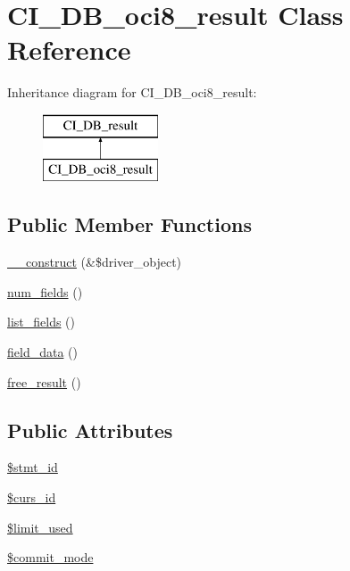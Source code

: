 \hypertarget{class_c_i___d_b__oci8__result}{}\section{C\+I\+\_\+\+D\+B\+\_\+oci8\+\_\+result Class Reference}
\label{class_c_i___d_b__oci8__result}
Inheritance diagram for C\+I\+\_\+\+D\+B\+\_\+oci8\+\_\+result\+:\begin{figure}[H]
\begin{center}
\leavevmode
\includegraphics[height=2.000000cm]{class_c_i___d_b__oci8__result}
\end{center}
\end{figure}
\subsection*{Public Member Functions}
\begin{DoxyCompactItemize}
\item 
\mbox{\hyperlink{class_c_i___d_b__oci8__result_a8e093c8b6e5733bc3f306385ee426ab7}{\+\_\+\+\_\+construct}} (\&\$driver\+\_\+object)
\item 
\mbox{\hyperlink{class_c_i___d_b__oci8__result_af831bf363e4d7d661a717a4932af449d}{num\+\_\+fields}} ()
\item 
\mbox{\hyperlink{class_c_i___d_b__oci8__result_a50b54eb4ea7cfd039740f532988ea776}{list\+\_\+fields}} ()
\item 
\mbox{\hyperlink{class_c_i___d_b__oci8__result_a84bffd65e53902ade1591716749a33e3}{field\+\_\+data}} ()
\item 
\mbox{\hyperlink{class_c_i___d_b__oci8__result_aad2d98d6beb3d6095405356c6107b473}{free\+\_\+result}} ()
\end{DoxyCompactItemize}
\subsection*{Public Attributes}
\begin{DoxyCompactItemize}
\item 
\mbox{\hyperlink{class_c_i___d_b__oci8__result_a1a97f17fd259cd27c73b65e6c3706ec0}{\$stmt\+\_\+id}}
\item 
\mbox{\hyperlink{class_c_i___d_b__oci8__result_a75e7d18ad2e68ace3813533c9da2e179}{\$curs\+\_\+id}}
\item 
\mbox{\hyperlink{class_c_i___d_b__oci8__result_a96df35d7e3e76bef21ebb80234fe59e8}{\$limit\+\_\+used}}
\item 
\mbox{\hyperlink{class_c_i___d_b__oci8__result_a9b3b7163763603c5a0bcdfd819ae074d}{\$commit\+\_\+mode}}
\end{DoxyCompactItemize}
